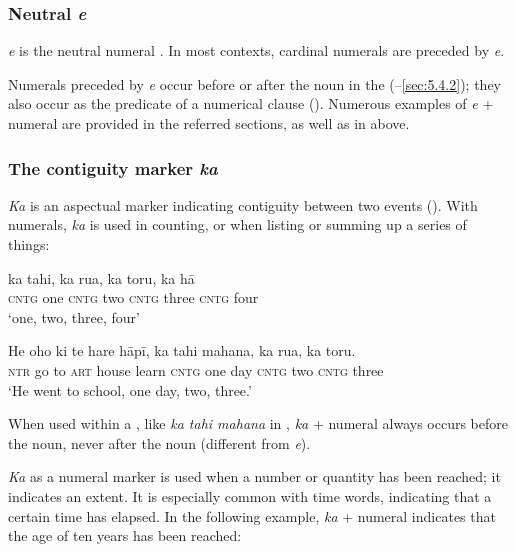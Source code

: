 \subsubsection[Neutral e]{Neutral \textit{e}}\label{sec:4.3.2.1}

\textit{e} is the neutral numeral . In most contexts, cardinal numerals are preceded by \textit{e}. 

Numerals preceded by \textit{e} occur before or after the noun in the  (–\ref{sec:5.4.2}); they also occur as the predicate of a numerical clause (). Numerous examples of \textit{e} + numeral are provided in the referred sections, as well as in  above.

\subsubsection[The contiguity marker ka]{The contiguity marker \textit{ka}}\label{sec:4.3.2.2}

\textit{Ka} is an aspectual marker indicating contiguity between two events (). With numerals, \textit{ka} is used in counting, or when listing or summing up a series of things:

\ea\label{ex:4.25}
\gll ka tahi, ka rua, ka toru, ka hā \\
\textsc{cntg} one \textsc{cntg} two \textsc{cntg} three \textsc{cntg} four \\

\glt 
‘one, two, three, four’
\z

\ea\label{ex:4.26}
\gll He oho ki te hare hāpī, ka tahi mahana, ka rua, ka toru. \\
\textsc{ntr} go to \textsc{art} house learn \textsc{cntg} one day \textsc{cntg} two \textsc{cntg} three \\

\glt
‘He went to school, one day, two, three.’ \textstyleExampleref{[R399.013]}  
\z

When used within a , like \textit{ka tahi mahana} in , \textit{ka} + numeral always occurs before the noun, never after the noun (different from \textit{e}). 

\textit{Ka} as a numeral marker is used when a number or quantity has been reached; it indicates an extent. It is especially common with time words, indicating that a certain time has elapsed. In the following example, \textit{ka} + numeral indicates that the age of ten years has been reached:

